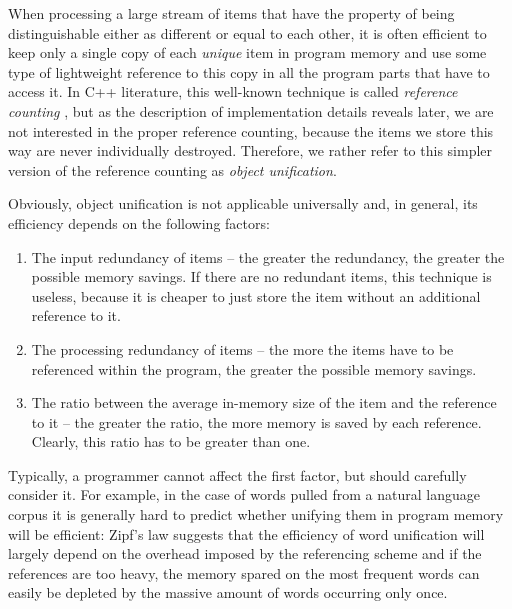 When processing a large stream of items that have the property of being distinguishable
either as different or equal to each other, it is often efficient to keep only a single
copy of each \emph{unique} item in program memory and use some type of lightweight
reference to this copy in all the program parts that have to access it.
In C++ literature, this well-known technique is called \emph{reference counting}
\citep[Item 29]{meyers:more-effective-cpp}, but as the description of implementation
details reveals later, we are not interested in the proper reference counting,
because the items we store this way are never individually destroyed.
Therefore, we rather refer to this simpler version of the reference counting as \emph{object
unification}.


Obviously, object unification is not applicable universally and, in general,
its efficiency depends on the following factors:
\begin{enumerate}
  \item The input redundancy of items -- the greater the redundancy, the greater
  the possible memory savings. If there are no redundant items, this technique is useless,
  because it is cheaper to just store the item without an additional reference to it.
  \item The processing redundancy of items -- the more the items have to be
  referenced within the program, the greater the possible memory savings.
  \item The ratio between the average in-memory size of the item and the reference to it -- the greater
  the ratio, the more memory is saved by each reference.
  Clearly, this ratio has to be greater than one.
\end{enumerate}

Typically, a programmer cannot affect the first factor, but should carefully consider it.
For example, in the case of words pulled from a natural language corpus it is generally hard to
predict whether unifying them in program memory will be efficient:
Zipf's law \citep[Chapter 1]{manning:stat-nlp} suggests that the efficiency of word unification
will largely depend on the overhead imposed by the referencing scheme and if the references are
too heavy, the memory spared on the most frequent words can easily be depleted by
the massive amount of words occurring only once.

